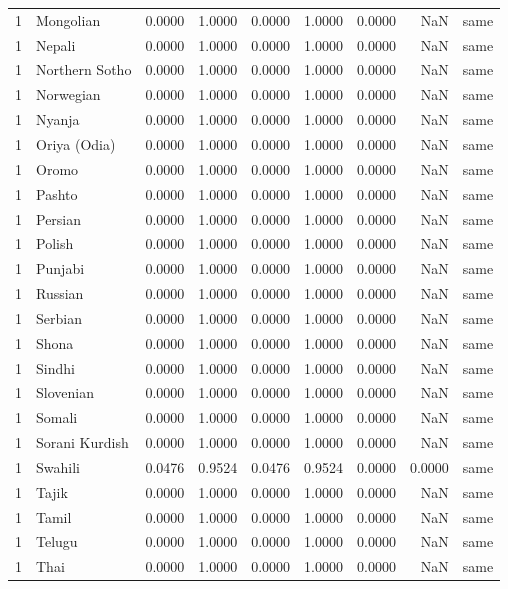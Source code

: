 \begin{tabular}{rlrrrrrrl}
1 & Mongolian & 0.0000 & 1.0000 & 0.0000 & 1.0000 & 0.0000 & NaN & same \\
1 & Nepali & 0.0000 & 1.0000 & 0.0000 & 1.0000 & 0.0000 & NaN & same \\
1 & Northern Sotho & 0.0000 & 1.0000 & 0.0000 & 1.0000 & 0.0000 & NaN & same \\
1 & Norwegian & 0.0000 & 1.0000 & 0.0000 & 1.0000 & 0.0000 & NaN & same \\
1 & Nyanja & 0.0000 & 1.0000 & 0.0000 & 1.0000 & 0.0000 & NaN & same \\
1 & Oriya (Odia) & 0.0000 & 1.0000 & 0.0000 & 1.0000 & 0.0000 & NaN & same \\
1 & Oromo & 0.0000 & 1.0000 & 0.0000 & 1.0000 & 0.0000 & NaN & same \\
1 & Pashto & 0.0000 & 1.0000 & 0.0000 & 1.0000 & 0.0000 & NaN & same \\
1 & Persian & 0.0000 & 1.0000 & 0.0000 & 1.0000 & 0.0000 & NaN & same \\
1 & Polish & 0.0000 & 1.0000 & 0.0000 & 1.0000 & 0.0000 & NaN & same \\
1 & Punjabi & 0.0000 & 1.0000 & 0.0000 & 1.0000 & 0.0000 & NaN & same \\
1 & Russian & 0.0000 & 1.0000 & 0.0000 & 1.0000 & 0.0000 & NaN & same \\
1 & Serbian & 0.0000 & 1.0000 & 0.0000 & 1.0000 & 0.0000 & NaN & same \\
1 & Shona & 0.0000 & 1.0000 & 0.0000 & 1.0000 & 0.0000 & NaN & same \\
1 & Sindhi & 0.0000 & 1.0000 & 0.0000 & 1.0000 & 0.0000 & NaN & same \\
1 & Slovenian & 0.0000 & 1.0000 & 0.0000 & 1.0000 & 0.0000 & NaN & same \\
1 & Somali & 0.0000 & 1.0000 & 0.0000 & 1.0000 & 0.0000 & NaN & same \\
1 & Sorani Kurdish & 0.0000 & 1.0000 & 0.0000 & 1.0000 & 0.0000 & NaN & same \\
1 & Swahili & 0.0476 & 0.9524 & 0.0476 & 0.9524 & 0.0000 & 0.0000 & same \\
1 & Tajik & 0.0000 & 1.0000 & 0.0000 & 1.0000 & 0.0000 & NaN & same \\
1 & Tamil & 0.0000 & 1.0000 & 0.0000 & 1.0000 & 0.0000 & NaN & same \\
1 & Telugu & 0.0000 & 1.0000 & 0.0000 & 1.0000 & 0.0000 & NaN & same \\
1 & Thai & 0.0000 & 1.0000 & 0.0000 & 1.0000 & 0.0000 & NaN & same \\

\end{tabular}
